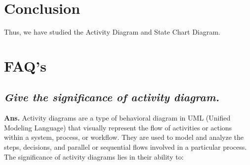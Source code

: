 \documentclass{article}
\begin{document}
\section{\textbf{Conclusion}}
Thus, we have studied the Activity Diagram and State Chart Diagram.
\section{\textbf{FAQ's}}
\subsection{\textit{Give the significance of activity diagram.}}
\textbf{Ans.} Activity diagrams are a type of behavioral diagram in UML (Unified Modeling Language) that visually represent the flow of activities or actions within a system, process, or workflow. They are used to model and analyze the steps, decisions, and parallel or sequential flows involved in a particular process. The significance of activity diagrams lies in their ability to:
\end{document}
